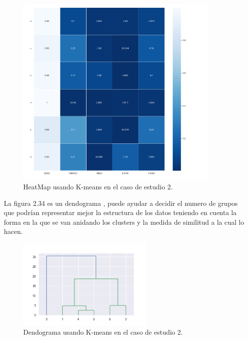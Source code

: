 	\begin{figure}[htb]
		\centering
		\includegraphics[width=0.9\textwidth]{./imagenes/caso2/heatmap_caso2_K-means}
		\caption{HeatMap usando K-means en el caso de estudio 2.} \label{fig:1}
	\end{figure}


	La figura 2.34 es un dendograma , puede ayudar a decidir el numero de grupos que podrían representar
	mejor la estructura de los datos teniendo en cuenta la forma en la que se van anidando los clusters
	y la medida de similitud a la cual lo hacen. \\

	\begin{figure}[htb]
		\centering
		\includegraphics[width=0.6\textwidth]{./imagenes/caso2/dendograma_caso2_K-means}
		\caption{Dendograma usando K-means en el caso de estudio 2.} \label{fig:1}
	\end{figure}

